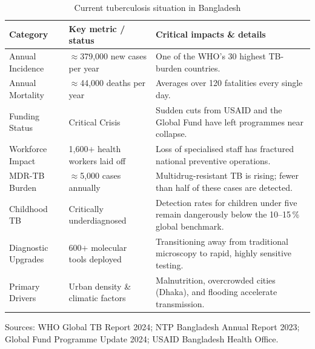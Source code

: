 \begin{table}[htbp]
\centering
\caption{Current tuberculosis situation in Bangladesh}
\label{tab:overview}
\small
\begin{tabular}{p{3.2cm}p{4.5cm}p{7.0cm}}
\toprule
\textbf{Category} & \textbf{Key metric / status} & \textbf{Critical impacts \& details} \\
\midrule
Annual Incidence & $\approx$379,000 new cases per year & One of the WHO's 30 highest TB-burden countries. \\[3pt]
Annual Mortality & $\approx$44,000 deaths per year & Averages over 120 fatalities every single day. \\[3pt]
Funding Status & Critical Crisis & Sudden cuts from USAID and the Global Fund have left programmes near collapse. \\[3pt]
Workforce Impact & 1{,}600$+$ health workers laid off & Loss of specialised staff has fractured national preventive operations. \\[3pt]
MDR-TB Burden & $\approx$5{,}000 cases annually & Multidrug-resistant TB is rising; fewer than half of these cases are detected. \\[3pt]
Childhood TB & Critically underdiagnosed & Detection rates for children under five remain dangerously below the 10--15\,\% global benchmark. \\[3pt]
Diagnostic Upgrades & 600$+$ molecular tools deployed & Transitioning away from traditional microscopy to rapid, highly sensitive testing. \\[3pt]
Primary Drivers & Urban density \& climatic factors & Malnutrition, overcrowded cities (Dhaka), and flooding accelerate transmission. \\[3pt]
\bottomrule
\end{tabular}
\par\smallskip
\raggedright\footnotesize Sources: WHO Global TB Report 2024; NTP Bangladesh Annual Report 2023; Global Fund Programme Update 2024; USAID Bangladesh Health Office.
\end{table}